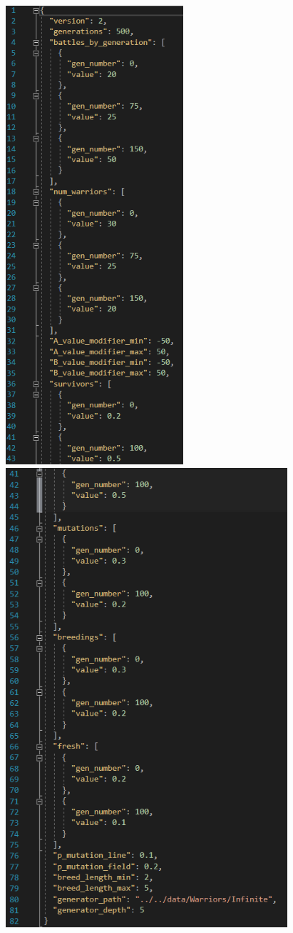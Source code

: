 \documentclass[french]{article}
\begin{document}
\begin{enumerate}
                    \begin{figure}[!h]
                    \includegraphics[height=17cm]{image/ParametresPartie1.png} \includegraphics[height=17cm]{image/ParametresPartie2.png}

\end{figure}
\end{enumerate}
\end{document}
